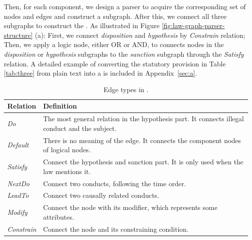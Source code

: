 Then, for each component, we design a parser to acquire the corresponding set of nodes and edges and construct a subgraph. After this, we connect all three subgraphs to construct the \lawgraph{}. As illustrated in Figure \ref{fig:law-graph-parser-structure} (a): First, we connect \textit{disposition} and \textit{hypothesis} by \textit{Constrain} relation; Then, we apply a logic node, either OR or AND, to connects nodes in the \textit{disposition} or \textit{hypothesis} subgraphs to the \textit{sanction} subgraph through the \textit{Satisfy} relation.
A detailed example of converting the statutory provision in Table \ref{tab:three} from plain text into a \lawgraph{} is included in Appendix~\ref{sec:a}.

\begin{table}
    \centering
    \small
    \begin{tabular}{p{} p{}}
    \toprule
        Relation & Definition\\ 
        \hline
        \textit{Do} & The most general relation in the hypothesis part. It connects illegal conduct and the subject.\\
        \hline
        \textit{Default} & There is no meaning of the edge. It connects the component nodes of logical nodes.\\
        \hline
        \textit{Satisfy} & Connect the hypothesis and sanction part. It is only used when the law mentions it.\\
        \hline
        \textit{NextDo} &
        Connect two conducts, following the time order.\\
        \hline
        \textit{LeadTo} &
        Connect two causally related conducts.\\
        \hline
        \textit{Modify} &
        Connect the node with its modifier, which represents some attributes.\\
        \hline
        \textit{Constrain} &
        Connect the node and its constraining condition.\\
        \bottomrule
    \end{tabular}
    \caption{Edge types in \lawgraph{}.}
    \label{tab:edge}
    \vspace{-2em}
\end{table}

